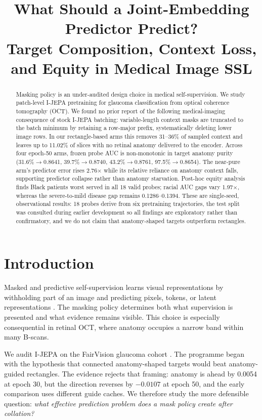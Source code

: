 \documentclass{article}
\title{What Should a Joint-Embedding Predictor Predict?\\
Target Composition, Context Loss, and Equity in Medical Image SSL}
\author{}
\begin{document}
\maketitle

\begin{abstract}
Masking policy is an under-audited design choice in medical self-supervision.
We study patch-level I-JEPA pretraining for glaucoma classification from
optical coherence tomography (OCT). We found no prior report of the following
medical-imaging consequence of stock I-JEPA batching: variable-length context
masks are truncated to the batch minimum by retaining a row-major prefix,
systematically deleting lower image rows. In our rectangle-based arms this
removes 31--36\% of sampled context and leaves up to 11.02\% of slices with no
retinal anatomy delivered to the encoder. Across four epoch-50 arms, frozen
probe AUC is non-monotonic in target anatomy purity
(31.6\%$\rightarrow$0.8641, 39.7\%$\rightarrow$0.8740,
43.2\%$\rightarrow$0.8761, 97.5\%$\rightarrow$0.8654). The near-pure arm's
predictor error rises 2.76$\times$ while its relative reliance on anatomy
context falls, supporting predictor collapse rather than anatomy starvation.
Post-hoc equity analysis finds Black patients worst served in all 18 valid
probes; racial AUC gaps vary 1.97$\times$, whereas the severe-to-mild disease
gap remains 0.1286--0.1394. These are single-seed, observational results:
18 probes derive from six pretraining trajectories, the test split was consulted
during earlier development so all findings are exploratory rather than
confirmatory, and we do not claim that anatomy-shaped targets outperform
rectangles.
\end{abstract}

\section{Introduction}

Masked and predictive self-supervision learns visual representations by
withholding part of an image and predicting pixels, tokens, or latent
representations \citep{he2022mae,bao2022beit,assran2023ijepa}. The masking
policy determines both what supervision is presented and what evidence remains
visible. This choice is especially consequential in retinal OCT, where anatomy
occupies a narrow band within many B-scans.

We audit I-JEPA \citep{assran2023ijepa} on the FairVision glaucoma cohort
\citep{luo2024fairvision}. The programme began with the hypothesis that
connected anatomy-shaped targets would beat anatomy-guided rectangles. The
evidence rejects that framing: anatomy is ahead by 0.0054 at epoch 30, but the
direction reverses by $-0.0107$ at epoch 50, and the early comparison uses
different guide caches. We therefore study the more defensible question:
\emph{what effective prediction problem does a mask policy create after
collation?}
\end{document}
